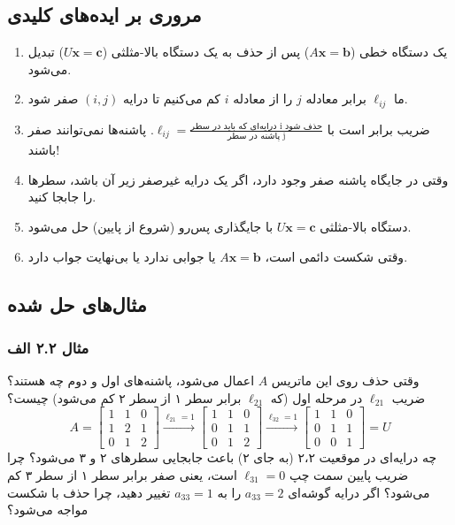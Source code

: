 \documentclass[12pt, a4paper]{book}
\theoremstyle{translator}
\begin{document}
	\subsection*{مروری بر ایده‌های کلیدی}
	\begin{enumerate}
		\item یک دستگاه خطی ($A\mathbf{x}=\mathbf{b}$) پس از حذف به یک دستگاه بالا-مثلثی ($U\mathbf{x}=\mathbf{c}$) تبدیل می‌شود.
		\item ما $\ell_{ij}$ برابر معادله $j$ را از معادله $i$ کم می‌کنیم تا درایه $(i,j)$ صفر شود.
		\item ضریب برابر است با $\ell_{ij} = \frac{\text{درایه‌ای که باید در سطر i حذف شود}}{\text{پاشنه در سطر j}}$. پاشنه‌ها نمی‌توانند صفر باشند!
		\item وقتی در جایگاه پاشنه صفر وجود دارد، اگر یک درایه غیرصفر زیر آن باشد، سطرها را جابجا کنید.
		\item دستگاه بالا-مثلثی $U\mathbf{x}=\mathbf{c}$ با جایگذاری پس‌رو (شروع از پایین) حل می‌شود.
		\item وقتی شکست دائمی است، $A\mathbf{x}=\mathbf{b}$ یا جوابی ندارد یا بی‌نهایت جواب دارد.
	\end{enumerate}
	
	\newpage
	\subsection*{مثال‌های حل شده}
	\subsubsection*{مثال ۲.۲ الف}
	وقتی حذف روی این ماتریس $A$ اعمال می‌شود، پاشنه‌های اول و دوم چه هستند؟ ضریب $\ell_{21}$ در مرحله اول (که $\ell_{21}$ برابر سطر ۱ از سطر ۲ کم می‌شود) چیست؟
	\[ A = \begin{bmatrix} 1 & 1 & 0 \\ 1 & 2 & 1 \\ 0 & 1 & 2 \end{bmatrix} \xrightarrow{\ell_{21}=1} \begin{bmatrix} 1 & 1 & 0 \\ 0 & 1 & 1 \\ 0 & 1 & 2 \end{bmatrix} \xrightarrow{\ell_{32}=1} \begin{bmatrix} 1 & 1 & 0 \\ 0 & 1 & 1 \\ 0 & 0 & 1 \end{bmatrix} = U \]
	چه درایه‌ای در موقعیت ۲،۲ (به جای ۲) باعث جابجایی سطرهای ۲ و ۳ می‌شود؟ چرا ضریب پایین سمت چپ $\ell_{31}=0$ است، یعنی صفر برابر سطر ۱ از سطر ۳ کم می‌شود؟ اگر درایه گوشه‌ای $a_{33}=2$ را به $a_{33}=1$ تغییر دهید، چرا حذف با شکست مواجه می‌شود؟
	
\end{document}
